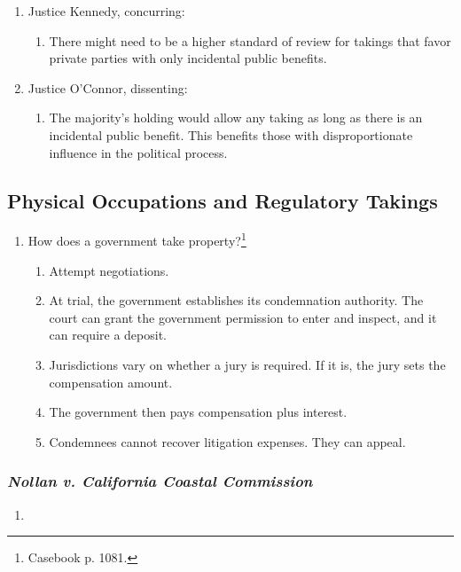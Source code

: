 \begin{enumerate}
\begin{enumerate}
    \end{enumerate}
    \item Justice Kennedy, concurring:
    \begin{enumerate}
        \item There might need to be a higher standard of review for takings 
        that favor private parties with only incidental public benefits.
    \end{enumerate}
    \item Justice O'Connor, dissenting:
    \begin{enumerate}
        \item The majority's holding would allow any taking as long as there 
        is an incidental public benefit. This benefits those with 
        disproportionate influence in the political process.
    \end{enumerate}
\end{enumerate}

\subsection{Physical Occupations and Regulatory Takings}
 
\begin{enumerate}
    \item How does a government take property?\footnote{Casebook p. 1081.}
    \begin{enumerate}
        \item Attempt negotiations.
        \item At trial, the government establishes its condemnation authority. 
        The court can grant the government permission to enter and inspect, 
        and it can require a deposit.
        \item Jurisdictions vary on whether a jury is required. If it is, the 
        jury sets the compensation amount.
        \item The government then pays compensation plus interest.
        \item Condemnees cannot recover litigation expenses. They can appeal.
    \end{enumerate}
 \end{enumerate}

\subsubsection{\emph{Nollan v. California Coastal Commission}}

\begin{enumerate}
    \item 
\end{enumerate}
 
